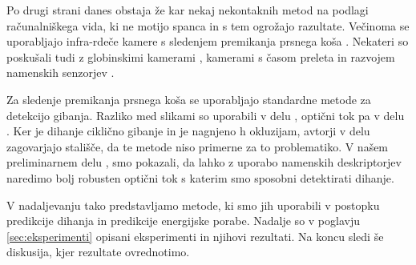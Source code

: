 Po drugi strani danes obstaja že kar nekaj nekontaknih metod na podlagi računalniškega vida, ki ne motijo spanca in s tem ogrožajo razultate. Večinoma se uporabljajo infra-rdeče kamere s sledenjem premikanja prsnega koša \cite{sathyanarayana2015vision}. Nekateri so poskušali tudi z globinskimi kamerami \cite{yang2014sleep}, kamerami s časom preleta \cite{falie2009statistical} in razvojem namenskih senzorjev \cite{takemura2005respiratory}.

Za sledenje premikanja prsnega koša se uporabljajo standardne metode za detekcijo gibanja. Razliko med slikami so uporabili v delu \cite{nakai2000non}, optični tok pa v delu \cite{nakajima2001development}. Ker je dihanje ciklično gibanje in je nagnjeno h okluzijam, avtorji v delu \cite{wang2014unconstrained} zagovarjajo stališče, da te metode niso primerne za to problematiko. V našem preliminarnem delu \cite{koporec2017observation}, smo pokazali, da lahko z uporabo namenskih deskriptorjev naredimo bolj robusten optični tok s katerim smo sposobni detektirati dihanje.

V nadaljevanju tako predstavljamo metode, ki smo jih uporabili v postopku predikcije dihanja in predikcije energijske porabe. Nadalje so v poglavju \ref{sec:eksperimenti} opisani eksperimenti in njihovi rezultati. Na koncu sledi še diskusija, kjer rezultate ovrednotimo. 
